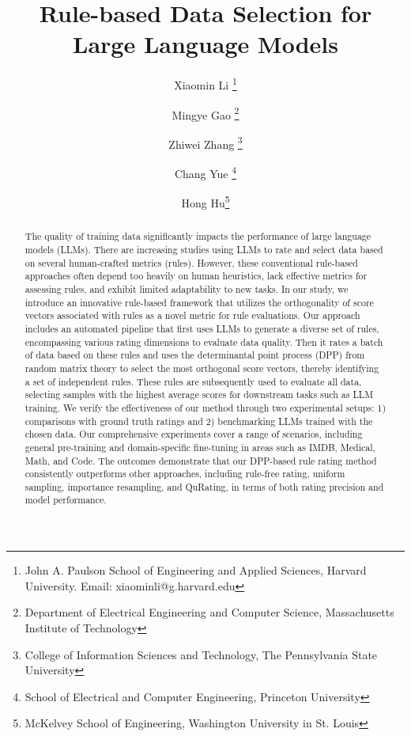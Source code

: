 \documentclass{article}
\begin{document}
\title{Rule-based Data Selection for Large Language Models}


\author{
    Xiaomin Li \thanks{John A. Paulson School of Engineering and Applied Sciences, Harvard University. Email: xiaominli@g.harvard.edu} \and
    Mingye Gao \thanks{Department of Electrical Engineering and Computer Science, Massachusetts Institute of Technology} \and
    Zhiwei Zhang \thanks{College of Information Sciences and Technology, The Pennsylvania State University}\and
    Chang Yue \thanks{School of Electrical and Computer Engineering, Princeton University}\and
    Hong Hu\thanks{McKelvey School of Engineering, Washington University in St. Louis}
}

\date{}

\maketitle

\begin{abstract}
The quality of training data significantly impacts the performance of large language models (LLMs). There are increasing studies using LLMs to rate and select data based on several human-crafted metrics (rules). However, these conventional rule-based approaches often depend too heavily on human heuristics, lack effective metrics for assessing rules, and exhibit limited adaptability to new tasks. In our study, we introduce an innovative rule-based framework that utilizes the orthogonality of score vectors associated with rules as a novel metric for rule evaluations. Our approach includes an automated pipeline that first uses LLMs to generate a diverse set of rules, encompassing various rating dimensions to evaluate data quality. Then it rates a batch of data based on these rules and uses the determinantal point process (DPP) from random matrix theory to select the most orthogonal score vectors, thereby identifying a set of independent rules. These rules are subsequently used to evaluate all data, selecting samples with the highest average scores for downstream tasks such as LLM training. We verify the effectiveness of our method through two experimental setups: 1) comparisons with ground truth ratings and 2) benchmarking LLMs trained with the chosen data. Our comprehensive experiments cover a range of scenarios, including general pre-training and domain-specific fine-tuning in areas such as IMDB, Medical, Math, and Code. The outcomes demonstrate that our DPP-based rule rating method consistently outperforms other approaches, including rule-free rating, uniform sampling, importance resampling, and QuRating, in terms of both rating precision and model performance.
\end{abstract}
\end{document}
